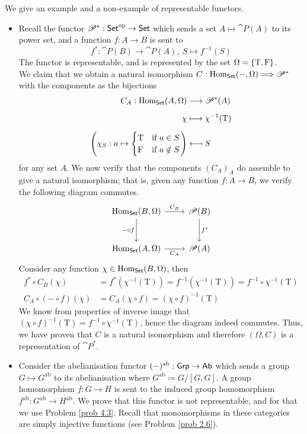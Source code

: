 \begin{example}\label{repfuncex}
We give an example and a non-example of representable functors. 
\begin{itemize}[itemsep=1.5em]
\item Recall the functor $\mathscr{P}^*:\mathsf{Set}^{\text{op}} \to \mathsf{Set}$ which sends a set $A \mapsto \cat{P}(A)$ to its power set, and a function $f: A \to B$ is sent to
\[f^*:\cat{P}(B) \to \cat{P}(A),\ S \mapsto f^{-1}(S)\]
The functor is representable, and is represented by the set $\Omega = \left\{\text{T},\text{F}\right\}$.\\[0.5em]
We claim that we obtain a natural isomorphism $C:\mathrm{Hom}_{\mathsf{Set}}(-,\Omega) \Longrightarrow \mathscr{P}^*$ with the components as the bijections
\begin{align*}
C_A: \mathrm{Hom}_{\mathsf{Set}}(A,\Omega) &\longrightarrow \mathscr{P}^*(A)\\[0.5em]
\chi &\longmapsto \chi^{-1}(\text{T})\\[0.5em]
\left(\chi_S: a \mapsto \begin{cases}\text{T} & \text{if } a \in S\\ \text{F} & \text{if } a \notin S \end{cases}\right) &\longmapsfrom S
\end{align*}
for any set $A$. We now verify that the components $(C_A)_A$ do assemble to give a natural isomorphism; that is, given any function $f: A \to B$, we verify the following diagram commutes.
\[\begin{tikzcd}
{\mathrm{Hom}_{\ncat{Set}}(B,\Omega)} \arrow[d, "-\circ f"'] \arrow[r, "C_B"] & \cat{P}(B) \arrow[d, "f^*"] \\[1em]
{\mathrm{Hom}_{\ncat{Set}}(A,\Omega)} \arrow[r, "C_A"']                       & \cat{P}(A)                 
\end{tikzcd}\]
Consider any function $\chi \in \mathrm{Hom}_{\mathsf{Set}}(B,\Omega)$, then
\begin{align*}
f^*\circ C_B(\chi) &= f^*(\chi^{-1}(\text{T})) = f^{-1}(\chi^{-1}(\text{T})) = f^{-1}\circ\chi^{-1}(\text{T})\\[0.5em]
C_A\circ (-\circ f)(\chi) &= C_A(\chi\circ f) = (\chi\circ f)^{-1}(\text{T})
\end{align*}
We know from properties of inverse image that $(\chi\circ f)^{-1}(\text{T}) = f^{-1}\circ\chi^{-1}(\text{T})$, hence the diagram indeed commutes. Thus, we have proven that $C$ is a natural isomorphism and therefore $(\Omega,C)$ is a representation of $\cat{P}^*$.
\item Consider the abelianisation functor $(-)^{\text{ab}}:\mathsf{Grp} \to \mathsf{Ab}$ which sends a group $G \mapsto G^{\text{ab}}$ to its abelianisation where $G^{\text{ab}} \coloneqq G/[G,G]$. A group homomorphism $f:G \to H$ is sent to the induced group homomorphism $f^{\text{ab}}:G^{\text{ab}} \to H^{\text{ab}}$. We prove that this functor is not representable, and for that we use Problem \ref{prob 4.3}. Recall that monomorphisms in these categories are simply injective functions (see Problem \ref{prob 2.6}).\\

\end{itemize}
\end{example}
